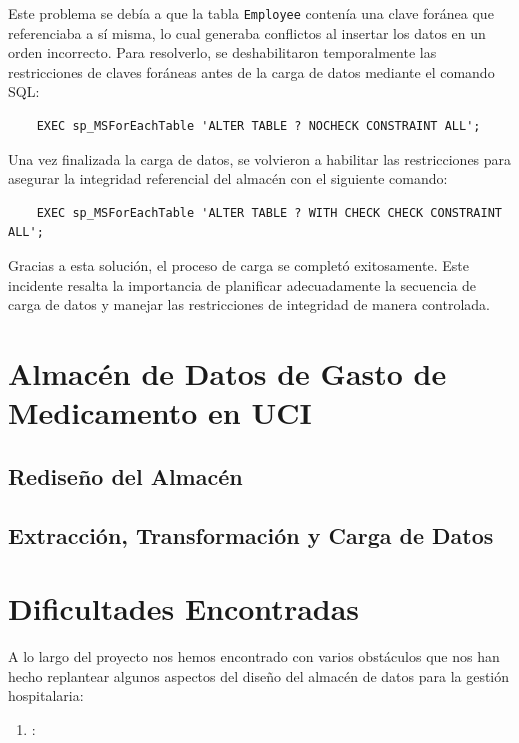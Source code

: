 \documentclass{article}
\begin{document}
Este problema se debía a que la tabla \texttt{Employee} contenía una clave foránea que referenciaba a sí misma, lo cual generaba conflictos al insertar los datos en un orden incorrecto. Para resolverlo, se deshabilitaron temporalmente las restricciones de claves foráneas antes de la carga de datos mediante el comando SQL:

\begin{verbatim}
	EXEC sp_MSForEachTable 'ALTER TABLE ? NOCHECK CONSTRAINT ALL';
\end{verbatim}

Una vez finalizada la carga de datos, se volvieron a habilitar las restricciones para asegurar la integridad referencial del almacén con el siguiente comando:

\begin{verbatim}
	EXEC sp_MSForEachTable 'ALTER TABLE ? WITH CHECK CHECK CONSTRAINT ALL';
\end{verbatim}

Gracias a esta solución, el proceso de carga se completó exitosamente. Este incidente resalta la importancia de planificar adecuadamente la secuencia de carga de datos y manejar las restricciones de integridad de manera controlada.



\section{Almacén de Datos de Gasto de Medicamento en UCI}

\subsection{Rediseño del Almacén}

\subsection{Extracción, Transformación y Carga de Datos}

\section{Dificultades Encontradas}
\label{sec:dificultades_encontradas}

A lo largo del proyecto nos hemos encontrado con varios obstáculos que nos han hecho replantear algunos aspectos del diseño del almacén de datos para la gestión hospitalaria:

\begin{enumerate}
	\item \textbf{}:
\end{enumerate}
\end{document}
